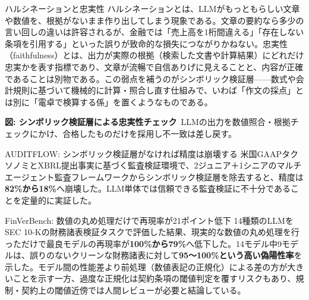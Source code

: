 \begin{concept}{ハルシネーションと忠実性}
ハルシネーションとは、LLMがもっともらしい文章や数値を、根拠がないまま作り出してしまう現象である。文章の要約なら多少の言い回しの違いは許容されるが、金融では「売上高を1桁間違える」「存在しない条項を引用する」といった誤りが致命的な損失につながりかねない。忠実性（faithfulness）とは、出力が実際の根拠（検索した文書や計算結果）にどれだけ忠実かを表す指標であり、文章が流暢で自信ありげに見えることと、内容が正確であることは別物である。この弱点を補うのがシンボリック検証層——数式や会計規則に基づいて機械的に計算・照合し直す仕組みで、いわば「作文の採点」とは別に「電卓で検算する係」を置くようなものである。
\begin{center}
\end{center}
{\small\color{brandgray}\textbf{図: シンボリック検証層による忠実性チェック}\ LLMの出力を数値照合・根拠チェックにかけ、合格したものだけを採用し不一致は差し戻す。}
\end{concept}

\begin{casestudy}{AUDITFLOW: シンボリック検証層がなければ精度は崩壊する}
米国GAAPタクソノミとXBRL提出事実に基づく監査検証環境で、2ジュニア＋1シニアのマルチエージェント監査フレームワークからシンボリック検証層を除去すると、精度は\textbf{82\%から18\%}へ崩壊した。LLM単体では信頼できる監査検証に不十分であることを定量的に実証した。\cite{auditflow2026}
\end{casestudy}

\begin{casestudy}{FinVerBench: 数値の丸め処理だけで再現率が21ポイント低下}
14種類のLLMをSEC 10-Kの財務諸表検証タスクで評価した結果、現実的な数値の丸め処理を行っただけで最良モデルの再現率が\textbf{100\%から79\%}へ低下した。14モデル中9モデルは、誤りのないクリーンな財務諸表に対して\textbf{95〜100\%という高い偽陽性率}を示した。モデル間の性能差より前処理（数値表記の正規化）による差の方が大きいことを示す一方、過度な正規化は契約条項の閾値判定を覆すリスクもあり、規制・契約上の閾値近傍では人間レビューが必要と結論している。\cite{finverbench2026}
\end{casestudy}

